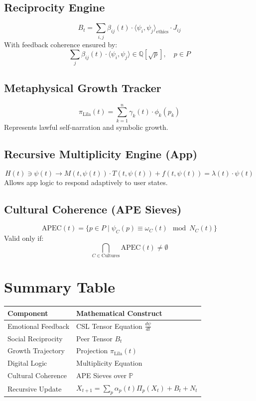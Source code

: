 \documentclass[11pt]{article}
\begin{document}
\subsection{Reciprocity Engine}
\[ B_t = \sum_{i,j} \beta_{ij}(t) \cdot \langle \psi_i, \psi_j \rangle_{\text{ethics}} \cdot J_{ij} \]
With feedback coherence ensured by:
\[ \sum_j \beta_{ij}(t) \cdot \langle \psi_i, \psi_j \rangle \in \mathbb{Q}[\sqrt{p}], \quad p \in P \]


\subsection{Metaphysical Growth Tracker}
\[ \pi_{\text{L\={i}la}}(t) = \sum_{k=1}^n \gamma_k(t) \cdot \phi_k(p_k) \]
Represents lawful self-narration and symbolic growth.


\subsection{Recursive Multiplicity Engine (App)}
\[ H(t) \ni \psi(t) \rightarrow M(t, \psi(t)) \cdot T(t, \psi(t)) + f(t, \psi(t)) = \lambda(t) \cdot \psi(t) \]
Allows app logic to respond adaptively to user states.


\subsection{Cultural Coherence (APE Sieves)}
\[ \text{APEC}(t) = \{ p \in P \mid \psi_C(p) \equiv \omega_C(t) \mod N_C(t) \} \]
Valid only if:
\[ \bigcap_{C \in \text{Cultures}} \text{APEC}(t) \neq \emptyset \]


\section*{Summary Table}
\begin{center}
\begin{tabular}{|l|l|}
\hline
\textbf{Component} & \textbf{Mathematical Construct} \\
\hline
Emotional Feedback & CSL Tensor Equation $\frac{d\psi}{dt}$ \\
Social Reciprocity & Peer Tensor $B_t$ \\
Growth Trajectory & Projection $\pi_{\text{L\={i}la}}(t)$ \\
Digital Logic & Multiplicity Equation \\
Cultural Coherence & APE Sieves over $\mathbb{P}$ \\
Recursive Update & $X_{t+1} = \sum_p \alpha_p(t)\Pi_p(X_t) + B_t + N_t$ \\
\hline
\end{tabular}
\end{center}
\end{document}
